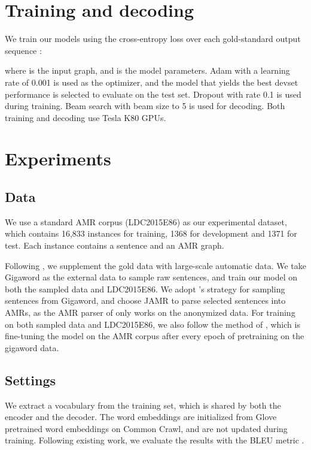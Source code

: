 \documentclass[11pt,a4paper]{article}
\begin{document}
\section{Training and decoding}

We train our models using the cross-entropy loss over each gold-standard output sequence :

where  is the input graph, and  is the model parameters.
Adam \cite{kingma2014adam} with a learning rate of 0.001 is used as the optimizer, and the model that yields the best devset performance is selected to evaluate on the test set.
Dropout with rate 0.1 is used during training.
Beam search with beam size to 5 is used for decoding.
Both training and decoding use Tesla K80 GPUs.


\section{Experiments}

\subsection{Data}

We use a standard AMR corpus (LDC2015E86) as our experimental dataset, which contains 16,833 instances for training, 1368 for development and 1371 for test. Each instance contains a sentence and an AMR graph.


Following , we supplement the gold data with large-scale automatic data.
We take Gigaword as the external data to sample raw sentences, and train our model on both the sampled data and LDC2015E86.
We adopt 's strategy for sampling sentences from Gigaword, and choose JAMR \cite{flanigan-EtAl:2016:SemEval} to parse selected sentences into AMRs, as the AMR parser of  only works on the anonymized data.
For training on both sampled data and LDC2015E86, we also follow the method of , which is fine-tuning the model on the AMR corpus after every epoch of pretraining on the gigaword data.

\subsection{Settings}

We extract a vocabulary from the training set, which is shared by both the encoder and the decoder.
The word embeddings are initialized from Glove pretrained word embeddings \cite{pennington2014glove} on Common Crawl, and are not updated during training.
Following existing work, we evaluate the results with the BLEU metric \cite{papineni2002bleu}.
\end{document}
